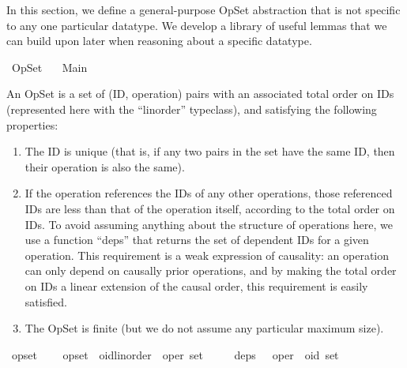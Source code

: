 %
\begin{isabellebody}%
%
%
\isamarkuptrue%
%
\begin{isamarkuptext}%
In this section, we define a general-purpose OpSet abstraction that is not
specific to any one particular datatype. We develop a library of useful lemmas
that we can build upon later when reasoning about a specific datatype.%
\end{isamarkuptext}\isamarkuptrue%
%
\isadelimtheory
%
\endisadelimtheory
%
\isatagtheory
{}\isamarkupfalse%
\ OpSet\isanewline
\ \ \ Main\isanewline
{}%
\endisatagtheory
{\isafoldtheory}%
%
\isadelimtheory
%
\endisadelimtheory
%
\isamarkuptrue%
%
\begin{isamarkuptext}%
An OpSet is a set of (ID, operation) pairs with an associated total order
on IDs (represented here with the ``linorder'' typeclass), and satisfying the
following properties:
\begin{enumerate}
\item The ID is unique (that is, if any two pairs in the set have the same ID,
then their operation is also the same).
\item If the operation references the IDs of any other operations, those
referenced IDs are less than that of the operation itself, according to the
total order on IDs. To avoid assuming anything about the structure of operations
here, we use a function ``deps'' that returns the set of dependent IDs for a given
operation. This requirement is a weak expression of causality: an operation can
only depend on causally prior operations, and by making the total order on IDs
a linear extension of the causal order, this requirement is easily satisfied.
\item The OpSet is finite (but we do not assume any particular maximum size).
\end{enumerate}%
\end{isamarkuptext}\isamarkuptrue%
\isamarkupfalse%
\ opset\ {\isacharequal}\isanewline
\ \ \ opset\ {\isacharcolon}{\isacharcolon}\ {\isachardoublequoteopen}{\isacharparenleft}{\isacharprime}oid{\isacharcolon}{\isacharcolon}{\isacharbraceleft}linorder{\isacharbraceright}\ {\isasymtimes}\ {\isacharprime}oper{\isacharparenright}\ set{\isachardoublequoteclose}\isanewline
\ \ \ \ \ deps\ \ {\isacharcolon}{\isacharcolon}\ {\isachardoublequoteopen}{\isacharprime}oper\ {\isasymRightarrow}\ {\isacharprime}oid\ set{\isachardoublequoteclose}\isanewline

\end{isabellebody}
